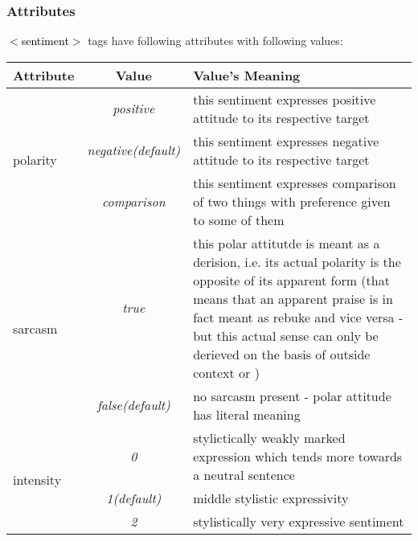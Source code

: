 \documentclass[11pt,a4paper]{article}
\newcommand{\xmltag}[1]{\textcolor{black}{{\small$<$#1$>$}}}
\begin{document}
\subsubsection{Attributes}
\xmltag{sentiment} tags have following attributes with following
values:

\begin{tabular}{|l|c|p{}|}\hline
  Attribute & Value & Value's Meaning\\\hline

  \multirow{3}{*}{polarity} & \textit{positive} & this sentiment
  expresses positive attitude to its respective target\\\cline{2-3}

  & \textit{negative\newline(default)} & this sentiment
  expresses negative attitude to its respective target\\\cline{2-3}

  & \textit{comparison} & this sentiment expresses comparison of two
  things with preference given to some of them\\\hline


  \multirow{2}{*}{sarcasm} & \textit{true} & this polar attitutde is
  meant as a derision, i.e. its actual polarity is the opposite of its
  apparent form (that means that an apparent praise is in fact meant
  as rebuke and vice versa - but this actual sense can only be
  derieved on the basis of outside context or )\\\cline{2-3}

  & \textit{false\newline(default)} & no sarcasm present - polar
  attitude has literal meaning\\\hline

  \multirow{3}{*}{intensity} & \textit{0} & stylictically weakly
  marked expression which tends more towards a neutral
  sentence\\\cline{2-3}

  & \textit{1\newline(default)} & middle stylistic
  expressivity\\\cline{2-3}

  & \textit{2} & stylistically very expressive sentiment\\\hline
\end{tabular}
\end{document}
